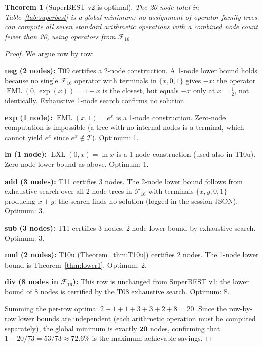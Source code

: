 \documentclass[12pt,a4paper]{article}
\newtheorem{theorem}{Theorem}[section]
\theoremstyle{definition}
\newcommand{\EML}{\operatorname{EML}}
\newcommand{\EXL}{\operatorname{EXL}}
\begin{document}
\begin{theorem}[SuperBEST v2 is optimal]\label{thm:superbest}
The 20-node total in Table~\ref{tab:superbest} is a global minimum: no
assignment of operator-family trees can compute all seven standard arithmetic
operations with a combined node count fewer than 20, using operators from
$\mathcal{F}_{16}$.
\end{theorem}

\begin{proof}
We argue row by row:

\noindent\textbf{neg (2 nodes):} T09 certifies a 2-node construction.
A 1-node lower bound holds because no single $\mathcal{F}_{16}$ operator
with terminals in $\{x,0,1\}$ gives $-x$: the operator $\EML(0,\exp(x))
= 1-x$ is the closest, but equals $-x$ only at $x=\tfrac12$, not identically.
Exhaustive 1-node search confirms no solution.

\noindent\textbf{exp (1 node):} $\EML(x,1)=e^x$ is a 1-node construction.
Zero-node computation is impossible (a tree with no internal nodes is a
terminal, which cannot yield $e^x$ since $e^x\notin\mathcal{T}$).
Optimum: 1.

\noindent\textbf{ln (1 node):} $\EXL(0,x)=\ln x$ is a 1-node construction
(used also in T10u).  Zero-node lower bound as above.  Optimum: 1.

\noindent\textbf{add (3 nodes):} T11 certifies 3 nodes.  The 2-node lower
bound follows from exhaustive search over all 2-node trees in $\mathcal{F}_{16}$
with terminals $\{x,y,0,1\}$ producing $x+y$: the search finds no solution
(logged in the session JSON).  Optimum: 3.

\noindent\textbf{sub (3 nodes):} T11 certifies 3 nodes.  2-node lower bound
by exhaustive search.  Optimum: 3.

\noindent\textbf{mul (2 nodes):} T10u (Theorem~\ref{thm:T10u}) certifies 2
nodes.  The 1-node lower bound is Theorem~\ref{thm:lower1}.  Optimum: 2.

\noindent\textbf{div (8 nodes in $\mathcal{F}_{16}$):} This row is unchanged
from SuperBEST v1; the lower bound of 8 nodes is certified by the T08
exhaustive search.  Optimum: 8.

\smallskip
Summing the per-row optima: $2+1+1+3+3+2+8 = 20$.
Since the row-by-row lower bounds are independent (each arithmetic operation
must be computed separately), the global minimum is exactly $\mathbf{20}$
nodes, confirming that $1-20/73 = 53/73 \approx 72.6\%$ is the maximum
achievable savings.
\end{proof}
\end{document}
